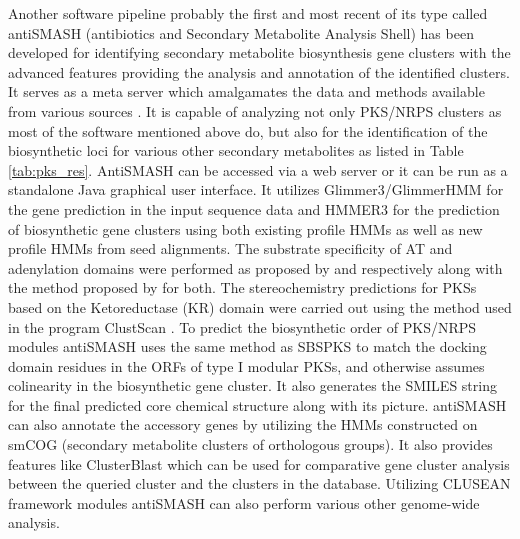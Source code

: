 \begin{doublespacing}
		Another software pipeline probably the first and most recent of its type called antiSMASH (antibiotics and Secondary Metabolite Analysis Shell) \parencite{Medema2011} has been developed for identifying secondary metabolite biosynthesis gene clusters with the advanced features providing the analysis and annotation of the identified clusters. It serves as a meta server which amalgamates the data and methods available from various sources \parencite{Rausch2007, Ansari2008, Yadav2009, Weber2009, Letunic2009, DeJong2010, Finn2010}. It is capable of analyzing not only PKS/NRPS clusters as most of the software mentioned above do, but also for the identification of the biosynthetic loci for various other secondary metabolites as listed in Table \ref{tab:pks_res}. AntiSMASH can be accessed via a web server or it can be run as a standalone Java graphical user interface. It utilizes Glimmer3/GlimmerHMM for the gene prediction in the input sequence data and HMMER3 for the prediction of biosynthetic gene clusters using both existing profile HMMs as well as new profile HMMs from seed alignments. The substrate specificity of AT and adenylation domains were performed as proposed by \parencite{Yadav2003} and \parencite{Rottig2011} respectively along with the method proposed by \parencite{Minowa2007} for both. %
		The stereochemistry predictions for PKSs based on the Ketoreductase (KR) domain were carried out using the method used in the program ClustScan \parencite{Starcevic2008}. To predict the biosynthetic order of PKS/NRPS modules antiSMASH uses the same method as SBSPKS to match the docking domain residues in the ORFs of type I modular PKSs, and otherwise assumes colinearity in the biosynthetic gene cluster. It also generates the SMILES string for the final predicted core chemical structure along with its picture. antiSMASH can also annotate the accessory genes by utilizing the HMMs constructed on smCOG (secondary metabolite clusters of orthologous groups). It also provides features like ClusterBlast which can be used for comparative gene cluster analysis between the queried cluster and the clusters in the database. Utilizing CLUSEAN framework modules antiSMASH can also perform various other genome-wide analysis. 



\end{doublespacing}
